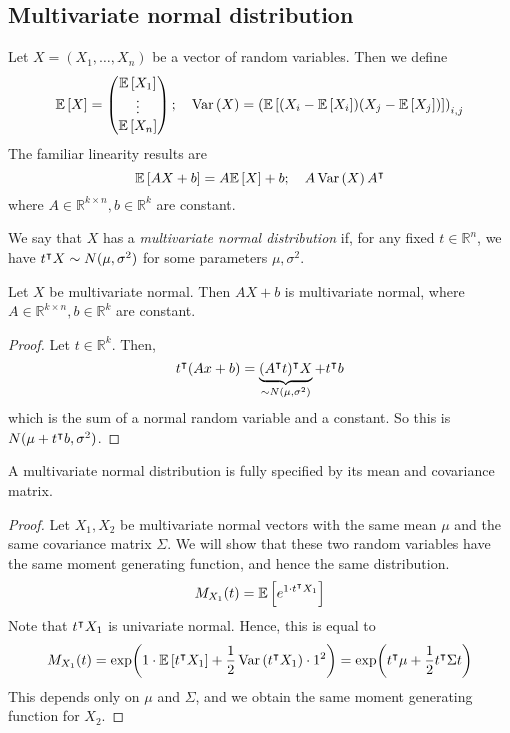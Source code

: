 \subsection{Multivariate normal distribution}
Let \( X = (X_1, \dots, X_n) \) be a vector of random variables.
Then we define
\[
	\mathbb{E}\left[{X}\right] = \begin{pmatrix}
		\mathbb{E}\left[{X_1}\right] \\
		\vdots       \\
		\mathbb{E}\left[{X_n}\right]
	\end{pmatrix};\quad \operatorname{Var}\left({X}\right) = \qty( \mathbb{E}\left[{\qty(X_i - \mathbb{E}\left[{X_i}\right])\qty(X_j - \mathbb{E}\left[{X_j}\right])}\right] )_{i,j}
\]
The familiar linearity results are
\[
	\mathbb{E}\left[{AX+b}\right] = A\mathbb{E}\left[{X}\right] + b;\quad A \operatorname{Var}\left({X}\right) A^\intercal
\]
where \( A \in \mathbb R^{k \times n}, b \in \mathbb R^k \) are constant.
\begin{definition}
	We say that \( X \) has a \textit{multivariate normal distribution} if, for any fixed \( t \in \mathbb R^n \), we have \( t^\intercal X \sim N(\mu, \sigma^2) \) for some parameters \( \mu, \sigma^2 \).
\end{definition}
\begin{proposition}
	Let \( X \) be multivariate normal.
	Then \( AX+b \) is multivariate normal, where \( A \in \mathbb R^{k \times n}, b \in \mathbb R^k \) are constant.
\end{proposition}
\begin{proof}
	Let \( t \in \mathbb R^k \).
	Then,
	\[
		t^\intercal (Ax+b) = \underbrace{(A^\intercal t)^\intercal X}_{\sim N(\mu, \sigma^2)} + t^\intercal b
	\]
	which is the sum of a normal random variable and a constant.
	So this is \( N(\mu + t^\intercal b, \sigma^2) \).
\end{proof}
\begin{proposition}
	A multivariate normal distribution is fully specified by its mean and covariance matrix.
\end{proposition}
\begin{proof}
	Let \( X_1, X_2 \) be multivariate normal vectors with the same mean \( \mu \) and the same covariance matrix \( \Sigma \).
	We will show that these two random variables have the same moment generating function, and hence the same distribution.
	\[
		M_{X_1}(t) = \mathbb{E}\left[{ e^{1 \cdot t^\intercal X_1} }\right]
	\]
	Note that \( t^\intercal X_1 \) is univariate normal.
	Hence, this is equal to
	\[
		M_{X_1}(t) = \exp(1 \cdot \mathbb{E}\left[{t^\intercal X_1}\right] + \frac{1}{2} \operatorname{Var}\left({t^\intercal X_1}\right) \cdot 1^2) = \exp(t^\intercal \mu + \frac{1}{2} t^\intercal \Sigma t)
	\]
	This depends only on \( \mu \) and \( \Sigma \), and we obtain the same moment generating function for \( X_2 \).
\end{proof}


